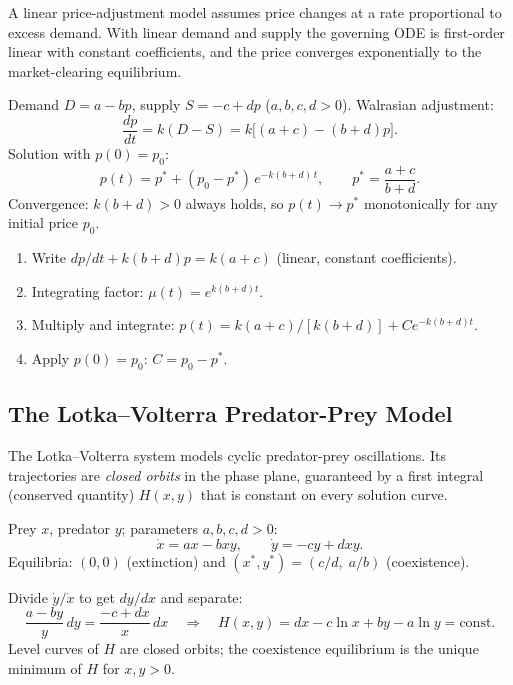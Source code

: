 A linear price-adjustment model assumes price changes at a rate proportional
to excess demand. With linear demand and supply the governing ODE is first-order
linear with constant coefficients, and the price converges exponentially to the
market-clearing equilibrium.

\begin{formulabox}
Demand $D = a - bp$, supply $S = -c + dp$ ($a,b,c,d > 0$).
Walrasian adjustment:
\[
  \frac{dp}{dt} = k(D - S) = k\bigl[(a+c) - (b+d)p\bigr].
\]
Solution with $p(0) = p_0$:
\[
  p(t) = p^* + (p_0 - p^*)\,e^{-k(b+d)\,t},
  \qquad p^* = \frac{a + c}{b + d}.
\]
Convergence: $k(b+d) > 0$ always holds, so $p(t) \to p^*$
monotonically for any initial price $p_0$.
\end{formulabox}

\begin{methodbox}
\begin{enumerate}[leftmargin=1.6em, itemsep=3pt]
  \item Write $dp/dt + k(b+d)p = k(a+c)$ (linear, constant coefficients).
  \item Integrating factor: $\mu(t) = e^{k(b+d)t}$.
  \item Multiply and integrate: $p(t) = k(a+c)/[k(b+d)] + Ce^{-k(b+d)t}$.
  \item Apply $p(0) = p_0$: $C = p_0 - p^*$.
\end{enumerate}
\end{methodbox}

\subsection{The Lotka--Volterra Predator-Prey Model}

The Lotka--Volterra system models cyclic predator-prey oscillations. Its
trajectories are \emph{closed orbits} in the phase plane, guaranteed by a
first integral (conserved quantity) $H(x,y)$ that is constant on every
solution curve.

\begin{formulabox}
Prey $x$, predator $y$; parameters $a,b,c,d > 0$:
\[
  \dot{x} = ax - bxy, \qquad \dot{y} = -cy + dxy.
\]
Equilibria: $(0,0)$ (extinction) and $(x^*, y^*) = (c/d,\; a/b)$ (coexistence).

Divide $\dot{y}/\dot{x}$ to get $dy/dx$ and separate:
\[
  \frac{a - by}{y}\,dy = \frac{-c + dx}{x}\,dx
  \quad\Longrightarrow\quad
  H(x,y) = dx - c\ln x + by - a\ln y = \text{const}.
\]
Level curves of $H$ are closed orbits; the coexistence equilibrium is the
unique minimum of $H$ for $x,y > 0$.
\end{formulabox}

